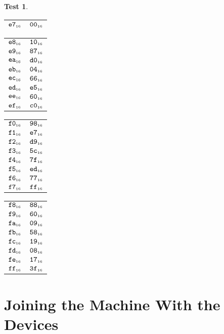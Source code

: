 \documentclass[a4paper,12pt]{article}
\makeatletter
\newcommand{\num}[1]{\texttt{\MakeLowercase{#1}}}
\newcommand{\hex}[1]{\num{#1}_{\textup{\tiny 16}}}
\newcommand{\MEM}[1]{\ifthenelse{\equal{#1}{}}{M}{M[#1]}}
\theoremstyle{definition}
\newtheorem{test}{Test}
\newenvironment{memtable}{%
  \begin{trivlist}
    \item
    }{%
    \end{trivlist}}
\newenvironment{memcolumn}{%
  \begin{tabular}{@{}ll@{}}
    \hline}
    {%
    \hline
  \end{tabular}}
\newcommand{\memspace}{\qquad}
\makeatother
\begin{document}
\begin{test}
\begin{memtable}
\begin{memcolumn}
      $\hex{E7}$ & $\hex{00}$ \\
    \end{memcolumn}
    \memspace
    \begin{memcolumn}
      $\hex{E8}$ & $\hex{10}$ \\
      $\hex{E9}$ & $\hex{87}$ \\
      $\hex{EA}$ & $\hex{D0}$ \\
      $\hex{EB}$ & $\hex{04}$ \\
      $\hex{EC}$ & $\hex{66}$ \\
      $\hex{ED}$ & $\hex{E5}$ \\
      $\hex{EE}$ & $\hex{60}$ \\
      $\hex{EF}$ & $\hex{C0}$ \\
    \end{memcolumn}
    \memspace
    \begin{memcolumn}
      $\hex{F0}$ & $\hex{98}$ \\
      $\hex{F1}$ & $\hex{E7}$ \\
      $\hex{F2}$ & $\hex{D9}$ \\
      $\hex{F3}$ & $\hex{5C}$ \\
      $\hex{F4}$ & $\hex{7F}$ \\
      $\hex{F5}$ & $\hex{ED}$ \\
      $\hex{F6}$ & $\hex{77}$ \\
      $\hex{F7}$ & $\hex{FF}$ \\
    \end{memcolumn}
    \memspace
    \begin{memcolumn}
      $\hex{F8}$ & $\hex{88}$ \\
      $\hex{F9}$ & $\hex{60}$ \\
      $\hex{FA}$ & $\hex{09}$ \\
      $\hex{FB}$ & $\hex{58}$ \\
      $\hex{FC}$ & $\hex{19}$ \\
      $\hex{FD}$ & $\hex{08}$ \\
      $\hex{FE}$ & $\hex{17}$ \\
      $\hex{FF}$ & $\hex{3F}$ \\
    \end{memcolumn}
  \end{memtable}
\end{test}

\section{Joining the Machine With the Devices}
\label{sec:building-devices}
\end{document}

